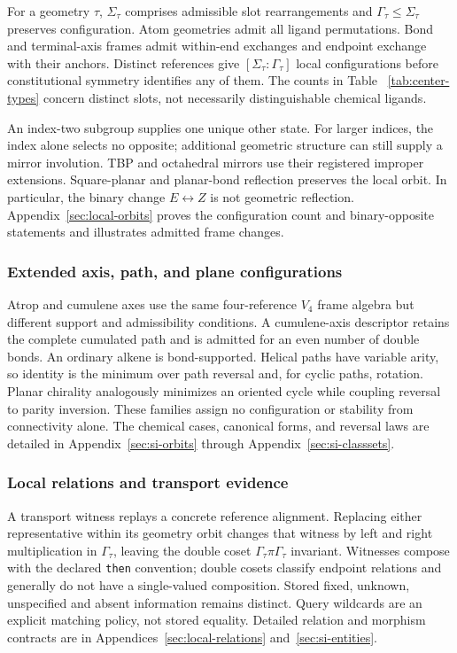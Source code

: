 \documentclass[pdflatex,sn-mathphys-num,referee,lineno]{sn-jnl}
\newcommand{\code}[1]{\texttt{#1}}
\theoremstyle{plain}
\theoremstyle{remark}
\theoremstyle{definition}
\begin{document}
For a geometry \(\tau\), \(\Sigma_\tau\) comprises admissible slot
rearrangements and \(\Gamma_\tau\leq\Sigma_\tau\) preserves configuration.
Atom geometries admit all ligand permutations. Bond and terminal-axis frames
admit within-end exchanges and endpoint exchange with their anchors. Distinct
references give \([\Sigma_\tau:\Gamma_\tau]\) local configurations before
constitutional symmetry identifies any of them. The counts in Table~
\ref{tab:center-types} concern distinct slots, not necessarily distinguishable
chemical ligands.

An index-two subgroup supplies one unique other state. For larger indices,
the index alone selects no opposite; additional geometric structure can still
supply a mirror involution. TBP and octahedral mirrors use their registered
improper extensions. Square-planar and planar-bond reflection preserves the
local orbit. In particular, the binary change \(E\leftrightarrow Z\) is not
geometric reflection. Appendix~\ref{sec:local-orbits} proves the configuration
count and binary-opposite statements and illustrates admitted frame changes.

\subsubsection{Extended axis, path, and plane configurations}

Atrop and cumulene axes use the same four-reference \(V_4\) frame algebra but
different support and admissibility conditions.  A cumulene-axis descriptor
retains the complete cumulated path and is admitted for an even number of
double bonds.  An ordinary alkene is bond-supported.  Helical paths have
variable arity, so identity is the minimum over path reversal and, for cyclic
paths, rotation.  Planar chirality analogously minimizes an oriented cycle
while coupling reversal to parity inversion.  These families assign no
configuration or stability from connectivity alone.  The chemical cases,
canonical forms, and reversal laws are detailed in
Appendix~\ref{sec:si-orbits} through Appendix~\ref{sec:si-classsets}.

\subsubsection{Local relations and transport evidence}

A transport witness replays a concrete reference alignment. Replacing either
representative within its geometry orbit changes that witness by left and
right multiplication in \(\Gamma_\tau\), leaving the double coset
\(\Gamma_\tau\pi\Gamma_\tau\) invariant. Witnesses compose with the declared
\code{then} convention; double cosets classify endpoint relations and generally
do not have a single-valued composition. Stored fixed, unknown, unspecified and
absent information remains distinct. Query wildcards are an explicit matching
policy, not stored equality. Detailed relation and morphism contracts are in
Appendices~\ref{sec:local-relations} and~\ref{sec:si-entities}.
\end{document}
